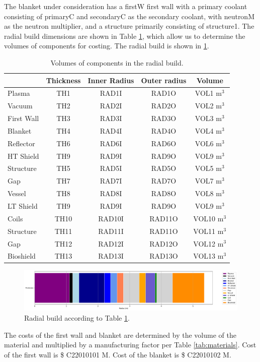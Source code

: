 The blanket under consideration has a firstW first wall with a primary coolant consisting of primaryC and secondaryC as the secondary coolant, with neutronM as the neutron multiplier, and a structure primarily consisting of structure1. The radial build dimensions are shown in Table \ref{tab:volumes}, which allow us to determine the volumes of components for costing.  The radial build is shown in \ref{fig:radial}.  \\


\begin{table}[h!]
    \centering
    \begin{tabular}{l c  c c c}
    \hline
        &	Thickness	&	Inner Radius	&	Outer radius	&	Volume		\\
        \hline
Plasma	&	TH1	&	RAD1I	&	RAD1O	&	VOL1	m$^{3}$	\\
Vacuum	&	TH2	&	RAD2I	&	RAD2O	&	VOL2	m$^{3}$	\\
First Wall	&	TH3	&	RAD3I	&	RAD3O	&	VOL3	m$^{3}$	\\
Blanket	&	TH4	&	RAD4I	&	RAD4O	&	VOL4	m$^{3}$	\\
Reflector	&	TH6	&	RAD6I	&	RAD6O	&	VOL6	m$^{3}$	\\
HT Shield	&	TH9	&	RAD9I	&	RAD9O	&	VOL9	m$^{3}$	\\
Structure	&	TH5	&	RAD5I	&	RAD5O	&	VOL5	m$^{3}$	\\
Gap	&	TH7	&	RAD7I	&	RAD7O	&	VOL7	m$^{3}$	\\
Vessel	&	TH8	&	RAD8I	&	RAD8O	&	VOL8	m$^{3}$	\\
LT Shield	&	TH9	&	RAD9I	&	RAD9O	&	VOL9	m$^{3}$	\\
Coils	&	TH10	&	RAD10I	&	RAD11O	&	VOL10	m$^{3}$	\\
Structure	&	TH11	&	RAD11I	&	RAD11O	&	VOL11	m$^{3}$	\\
Gap	&	TH12	&	RAD12I	&	RAD12O	&	VOL12	m$^{3}$	\\
Bioshield	&	TH13	&	RAD13I	&	RAD13O	&	VOL13	m$^{3}$	\\

        \hline
    \end{tabular}
    \caption{Volumes of components in the radial build.}
    \label{tab:volumes}
\end{table}

\begin{figure}
    \centering
    \includegraphics[width=0.9\linewidth]{Figures/radial_build.pdf}
    \caption{Radial build according to Table \ref{tab:volumes}.}
    \label{fig:radial}
\end{figure}



The costs of the first wall and blanket are determined by the volume of the material and multiplied by a manufacturing factor per Table \ref{tab:materials}.   Cost of the first wall is \$ C22010101 M.  Cost of the blanket is \$ C22010102 M.

